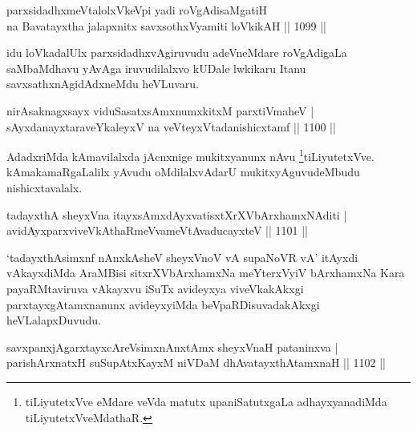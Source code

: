 \begin{shl}
parxsidadhxmeVtalolxVkeV\s pi yadi roVgAdisaMgatiH \\
na Bavatayxtha jalapxnitx savxsothxV\s yamiti loVkikAH \hfill ||  1099 || 
\end{shl}

\begin{artha}
idu loVkadalUlx parxsidadhxvAgiruvudu adeVneMdare roVgAdigaLa saMbaMdhavu yAvAga iruvudilalxvo kUDale lwkikaru Itanu savxsathxnAgidAdxneMdu heVLuvaru.
\end{artha}


\begin{shl}
nirAsaknagxsayx viduSasatxsAmxnumxkitxM parxtiVmaheV | \\
\footnotemark[2]sAyxdanayxtaraveYkaleyxV na veVteyxVtadanishicxtamf \hfill||  1100 ||  
\end{shl}

\begin{artha}
AdadxriMda kAmavilalxda jAcnxnige mukitxyanunx nAvu \footnote{tiLiyutetxVve eMdare veVda matutx upaniSatutxgaLa adhayxyanadiMda tiLiyutetxVveMdathaR.}tiLiyutetxVve. kAmakamaRgaLalilx yAvudu oMdilalxvAdarU mukitxyAguvudeMbudu nishicxtavalalx.
\end{artha}


\begin{shl}
tadayxthA sheyxVna itayxsAmxdAyxvatisxtXrXVbArxhamxNAditi | \\
avidAyxparxviveVkAthaRmeVvameVtAvaducayxteV \hfill||  1101 ||  
\end{shl}

\begin{artha}
`tadayxthAsimxnf nAnxkAsheV sheyxVnoV vA supaNoVR vA' itAyxdi vAkayxdiMda AraMBisi sitxrXVbArxhamxNa meYterxVyiV bArxhamxNa Kara payaRMtaviruva vAkayxvu iSuTx avideyxya viveVkakAkxgi parxtayxgAtamxnanunx avideyxyiMda beVpaRDisuvadakAkxgi heVLalapxDuvudu.
\end{artha}


\begin{shl}
savxpanxjAgarxtayxcAreV\s simxnAnxtAmx sheyxVnaH pataninxva | \\
parishArxnatxH suSupAtxKayxM niVDaM dhAvatayxthA\s \s tamxnaH \hfill||  1102 ||  
\end{shl}

